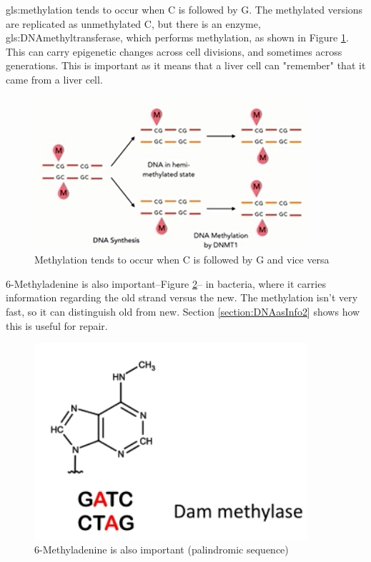 \documentclass[]{article}
\begin{document}
\Gls{gls:methylation} tends to occur when C is followed by G. The methylated versions are replicated as unmethylated C, but there is an enzyme, \gls{gls:DNAmethyltransferase}, which performs methylation, as shown in Figure \ref{fig:5-methylcytosine-in-action}. This can carry epigenetic changes across cell divisions, and sometimes across generations. This is important as it means that a liver cell can "remember" that it came from a liver cell.
\begin{figure}[H]
	\caption{Methylation tends to occur when C is followed by G and vice versa} \label{fig:5-methylcytosine-in-action} 
	\includegraphics[width=0.9\textwidth]{5-methylcytosine-in-action}
\end{figure}

6-Methyladenine is also important--Figure \ref{fig:6-Methyladenine}-- in bacteria, where it carries information regarding the old strand versus the new. The methylation isn't very fast, so it can distinguish old from new. Section \ref{section:DNAasInfo2} shows how this is useful for repair.

\begin{figure}[H]
	\caption{6-Methyladenine is also important (palindromic sequence)} \label{fig:6-Methyladenine} 
	\includegraphics[width=0.9\textwidth]{6-Methyladenine}
\end{figure}
\end{document}
